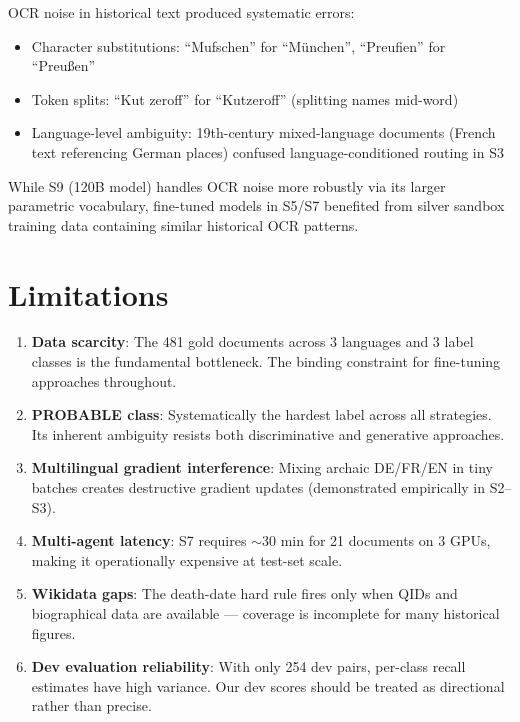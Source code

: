 \documentclass{ceurart}
\begin{document}
OCR noise in historical text produced systematic errors:
\begin{itemize}
  \item Character substitutions: ``Mufschen'' for ``M{\"u}nchen'', ``Preuﬁen'' for ``Preu{\ss}en''
  \item Token splits: ``Kut zeroff'' for ``Kutzeroff'' (splitting names mid-word)
  \item Language-level ambiguity: 19th-century mixed-language documents (French text referencing German places) confused language-conditioned routing in S3
\end{itemize}
While S9 (120B model) handles OCR noise more robustly via its larger parametric vocabulary, fine-tuned models in S5/S7 benefited from silver sandbox training data containing similar historical OCR patterns.

\section{Limitations}
\label{sec:limitations}

\begin{enumerate}
  \item \textbf{Data scarcity}: The 481 gold documents across 3 languages and 3 label classes is the fundamental bottleneck. The binding constraint for fine-tuning approaches throughout.
  \item \textbf{PROBABLE class}: Systematically the hardest label across all strategies. Its inherent ambiguity resists both discriminative and generative approaches.
  \item \textbf{Multilingual gradient interference}: Mixing archaic DE/FR/EN in tiny batches creates destructive gradient updates (demonstrated empirically in S2--S3).
  \item \textbf{Multi-agent latency}: S7 requires $\sim$30 min for 21 documents on 3 GPUs, making it operationally expensive at test-set scale.
  \item \textbf{Wikidata gaps}: The death-date hard rule fires only when QIDs and biographical data are available --- coverage is incomplete for many historical figures.
  \item \textbf{Dev evaluation reliability}: With only 254 dev pairs, per-class recall estimates have high variance. Our dev scores should be treated as directional rather than precise.
\end{enumerate}
\end{document}
